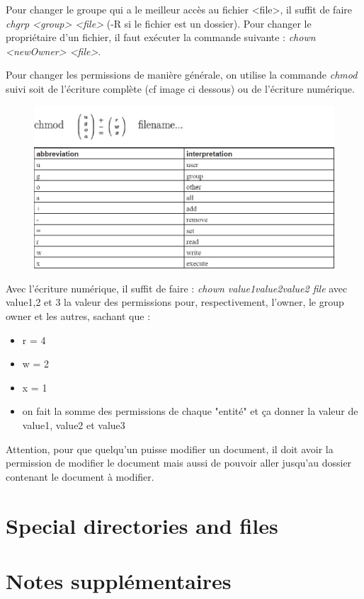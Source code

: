 \documentclass{article}
\begin{document}
\noindent Pour changer le groupe qui a le meilleur accès au fichier <file>, il suffit de faire \textit{chgrp <group> <file>} (-R si le fichier est un dossier).\newline
Pour changer le propriétaire d'un fichier, il faut exécuter la commande suivante : \textit{chown <newOwner> <file>}.

Pour changer les permissions de manière générale, on utilise la commande \textit{chmod} suivi soit de l'écriture complète (cf image ci dessous) ou de l'écriture numérique.
\begin{figure}[h]
    \centering
    \includegraphics[scale=0.3]{Images/Permissions.png}
\end{figure}

Avec l'écriture numérique, il suffit de faire : \textit{chown value1value2value2 file} avec value1,2 et 3 la valeur des permissions pour, respectivement, l'owner, le group owner et les autres, sachant que :
\begin{itemize}
    \item r = 4
    \item w = 2
    \item x = 1
    \item on fait la somme des permissions de chaque "entité" et ça donner la valeur de value1, value2 et value3
\end{itemize}

\noindent Attention, pour que quelqu'un puisse modifier un document, il doit avoir la permission de modifier le document mais aussi de pouvoir aller jusqu'au dossier contenant le document à modifier.

\newpage
\section{Special directories and files}
\newpage
\section{Notes supplémentaires}
\end{document}
